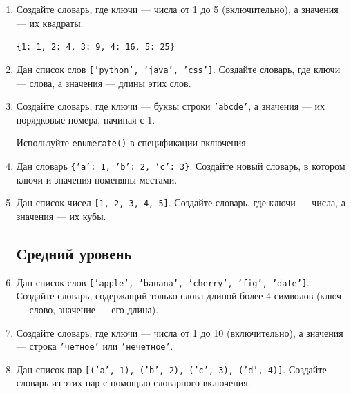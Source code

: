 \documentclass[a4,12pt]{article}
\theoremstyle{remark}
\begin{document}
\begin{enumerate}

    \subsection*{Начальный уровень}

    \item Создайте словарь, где ключи — числа от 1 до 5 (включительно),
    а значения — их квадраты.

    \begin{exerciseexample}
        \texttt{\{1: 1,\ 2: 4,\ 3: 9,\ 4: 16,\ 5: 25\}}
    \end{exerciseexample}

    \item Дан список слов \texttt{['python', 'java', 'css']}.
    Создайте словарь, где ключи — слова, а значения — длины этих слов.

    \item Создайте словарь, где ключи — буквы строки \texttt{'abcde'},
    а значения — их порядковые номера, начиная с 1.

    \begin{exercisehint}
        Используйте \texttt{enumerate()} в спецификации включения.
    \end{exercisehint}

    \item Дан словарь \texttt{\{'a': 1, 'b': 2, 'c': 3\}}.
    Создайте новый словарь, в котором ключи и значения поменяны местами.

    \item Дан список чисел \texttt{[1, 2, 3, 4, 5]}.
    Создайте словарь, где ключи — числа, а значения — их кубы.

    \subsection*{Средний уровень}

    \item Дан список слов \texttt{['apple', 'banana', 'cherry', 'fig', 'date']}.
    Создайте словарь, содержащий только слова длиной более 4 символов
    (ключ — слово, значение — его длина).

    \item Создайте словарь, где ключи — числа от 1 до 10 (включительно),
    а значения — строка \texttt{'четное'} или \texttt{'нечетное'}.

    \item Дан список пар \texttt{[('a', 1), ('b', 2), ('c', 3), ('d', 4)]}.
    Создайте словарь из этих пар с помощью словарного включения.


\end{enumerate}
\end{document}
